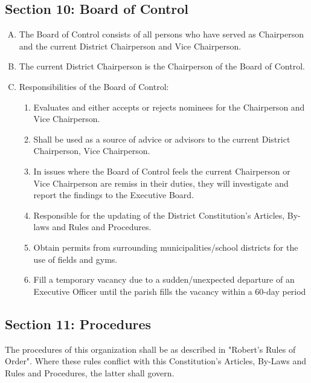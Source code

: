 \documentclass[draft]{memoir}
\begin{document}
\subsection{Section 10: Board of Control}
\begin{enumerate}[A.]
    \item The Board of Control consists of all persons who have served as Chairperson and the current District 
    Chairperson and Vice Chairperson.
    \item The current District Chairperson is the Chairperson of the Board of Control.
    \item Responsibilities of the Board of Control:
    \begin{enumerate}[1.]
        \item Evaluates and either accepts or rejects nominees for the Chairperson and Vice Chairperson.
        \item Shall be used as a source of advice or advisors to the current District Chairperson, Vice Chairperson. 
        \item In issues where the Board of Control feels the current Chairperson or Vice Chairperson are remiss in their duties, they will investigate and report the findings to the Executive Board.
        \item Responsible for the updating of the District Constitution’s Articles, By-laws and Rules and Procedures.
        \item Obtain permits from surrounding municipalities/school districts for the use of fields and gyms.
        \item Fill a temporary vacancy due to a sudden/unexpected departure of an Executive Officer until the parish fills the vacancy within a 60-day period
    \end{enumerate}
\end{enumerate}

\subsection{Section 11: Procedures}
The procedures of this organization shall be as described in "Robert's Rules of Order".  Where these rules conflict with this Constitution’s Articles, By-Laws and Rules and Procedures, the latter shall govern.
    
\end{document}
